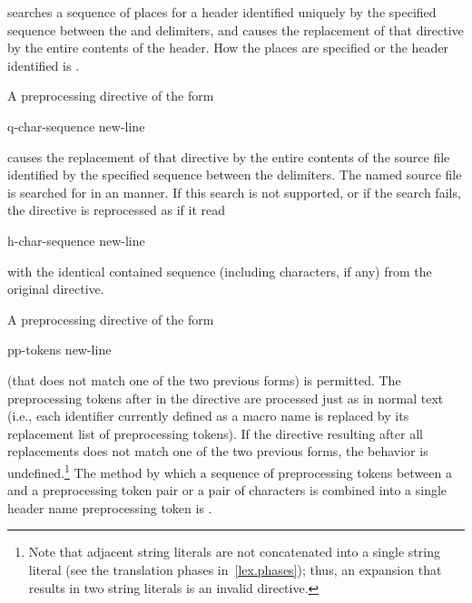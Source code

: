 searches a sequence of
places
for a header identified uniquely by the specified sequence
between the
\tcode{<}
and
\tcode{>}
delimiters,
and causes the replacement of that
directive by the entire contents of the header.
How the places are specified
or the header identified
is .

\pnum
A preprocessing directive of the form

\begin{ncsimplebnf}
q-char-sequence new-line
\end{ncsimplebnf}

causes the replacement of that
directive by the entire contents of the
source file identified by the specified sequence between the
delimiters.
The named source file is searched for in an
manner.
If this search is not supported,
or if the search fails,
the directive is reprocessed as if it read

\begin{ncsimplebnf}
h-char-sequence\terminal{>} new-line
\end{ncsimplebnf}

with the identical contained sequence (including
\tcode{>}
characters, if any) from the original directive.

\pnum
A preprocessing directive of the form

\begin{ncsimplebnf}
 pp-tokens new-line
\end{ncsimplebnf}

(that does not match one of the two previous forms) is permitted.
The preprocessing tokens after
in the directive are processed just as in normal text
(i.e., each identifier currently defined as a macro name is replaced by its
replacement list of preprocessing tokens).
If the directive resulting after all replacements does not match
one of the two previous forms, the behavior is
undefined.\footnote{Note that adjacent string literals are not concatenated into
a single string literal
(see the translation phases in~\ref{lex.phases});
thus, an expansion that results in two string literals is an
invalid directive.}
The method by which a sequence of preprocessing tokens between a
\tcode{<}
and a
\tcode{>}
preprocessing token pair or a pair of
characters is combined into a single header name
preprocessing token is .

